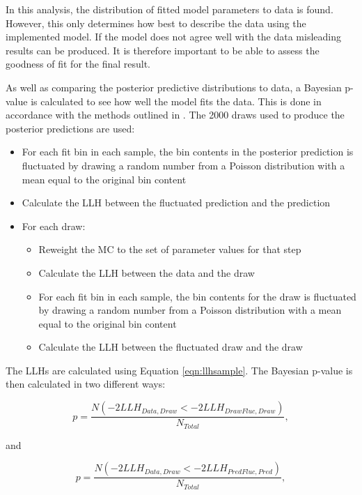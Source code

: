 In this analysis, the distribution of fitted model parameters to data is found. However, this only determines how best to describe the data using the implemented model. If the model does not agree well with the data misleading results can be produced. It is therefore important to be able to assess the goodness of fit for the final result.

As well as comparing the posterior predictive distributions to data, a Bayesian p-value is calculated to see how well the model fits the data. This is done in accordance with the methods outlined in \cite{Gelman_Example,Gelman_Post,Gelman_Understanding}.  The 2000 draws used to produce the posterior predictions are used:

\begin{itemize}
	\item For each fit bin in each sample, the bin contents in the posterior prediction is fluctuated by drawing a random number from a Poisson distribution with a mean equal to the original bin content
	\item Calculate the LLH between the fluctuated prediction and the prediction
   \item For each draw:
   \begin{itemize}
   \item Reweight the MC to the set of parameter values for that step
   \item Calculate the LLH between the data and the draw
   \item For each fit bin in each sample, the bin contents for the draw is fluctuated by drawing a random number from a Poisson distribution with a mean equal to the original bin content
  \item Calculate the LLH between the fluctuated draw and the draw
  \end{itemize}
\end{itemize}

The LLHs are calculated using Equation \ref{eqn:llhsample}. The Bayesian p-value is then calculated in two different ways:

\begin{equation}
p = \frac{N(-2LLH_{Data, Draw} < -2LLH_{Draw Fluc, Draw})}{N_{Total}},
\end{equation}

and

\begin{equation}
p = \frac{N(-2LLH_{Data, Draw} < -2LLH_{Pred Fluc, Pred})}{N_{Total}},
\end{equation}

